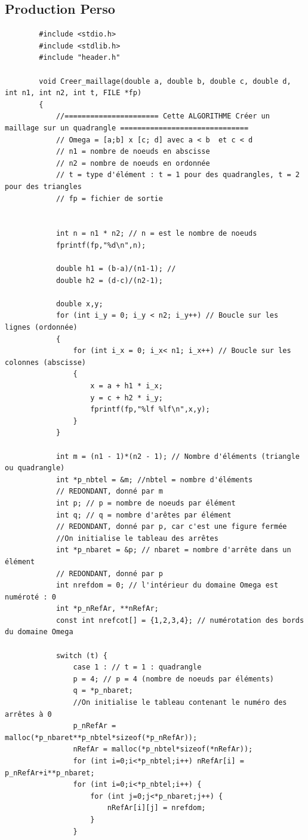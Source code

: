 \documentclass[12pt,a4paper]{article}
\begin{document}
	\subsection{Production Perso}
	
	\begin{verbatim}
		#include <stdio.h>
		#include <stdlib.h>
		#include "header.h"
		
		void Creer_maillage(double a, double b, double c, double d, int n1, int n2, int t, FILE *fp)
		{
			//====================== Cette ALGORITHME Créer un maillage sur un quadrangle ==============================
			// Omega = [a;b] x [c; d] avec a < b  et c < d
			// n1 = nombre de noeuds en abscisse
			// n2 = nombre de noeuds en ordonnée
			// t = type d'élément : t = 1 pour des quadrangles, t = 2 pour des triangles
			// fp = fichier de sortie
			
			
			int n = n1 * n2; // n = est le nombre de noeuds
			fprintf(fp,"%d\n",n);
			
			double h1 = (b-a)/(n1-1); // 
			double h2 = (d-c)/(n2-1);
			
			double x,y;
			for (int i_y = 0; i_y < n2; i_y++) // Boucle sur les lignes (ordonnée)
			{
				for (int i_x = 0; i_x< n1; i_x++) // Boucle sur les colonnes (abscisse)
				{
					x = a + h1 * i_x;
					y = c + h2 * i_y;
					fprintf(fp,"%lf %lf\n",x,y);
				}
			}
			
			int m = (n1 - 1)*(n2 - 1); // Nombre d'éléments (triangle ou quadrangle)  
			int *p_nbtel = &m; //nbtel = nombre d'éléments 
			// REDONDANT, donné par m
			int p; // p = nombre de noeuds par élément
			int q; // q = nombre d'arêtes par élément
			// REDONDANT, donné par p, car c'est une figure fermée
			//On initialise le tableau des arrêtes
			int *p_nbaret = &p; // nbaret = nombre d'arrête dans un élément 
			// REDONDANT, donné par p
			int nrefdom = 0; // l'intérieur du domaine Omega est numéroté : 0
			int *p_nRefAr, **nRefAr;
			const int nrefcot[] = {1,2,3,4}; // numérotation des bords du domaine Omega
			
			switch (t) {
				case 1 : // t = 1 : quadrangle
				p = 4; // p = 4 (nombre de noeuds par éléments)
				q = *p_nbaret;
				//On initialise le tableau contenant le numéro des arrêtes à 0
				p_nRefAr = malloc(*p_nbaret**p_nbtel*sizeof(*p_nRefAr));
				nRefAr = malloc(*p_nbtel*sizeof(*nRefAr));
				for (int i=0;i<*p_nbtel;i++) nRefAr[i] = p_nRefAr+i**p_nbaret;
				for (int i=0;i<*p_nbtel;i++) {
					for (int j=0;j<*p_nbaret;j++) {
						nRefAr[i][j] = nrefdom;
					}
				}
				

\end{verbatim}
\end{document}
